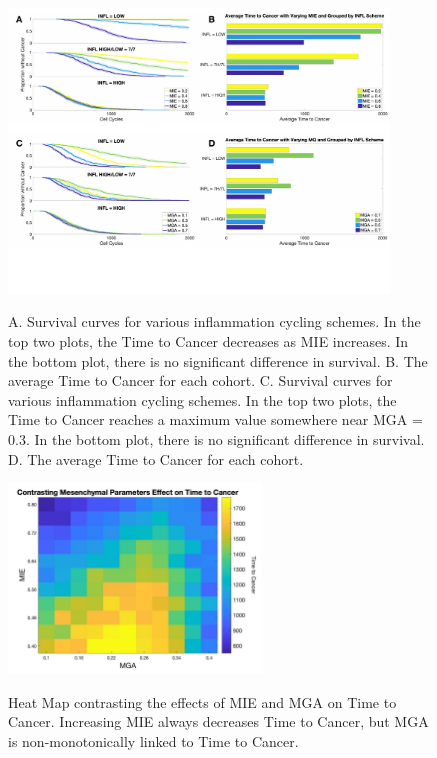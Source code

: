 \documentclass[11pt]{article}
\begin{document}
\begin{figure}
\center
{\includegraphics[width=0.9\textwidth]{Figure4/Figure4.pdf}}
\caption{A. Survival curves for various inflammation cycling schemes. In the top two plots, the Time to Cancer decreases as MIE increases. In the bottom plot, there is no significant difference in survival.
B. The average Time to Cancer for each cohort.
C. Survival curves for various inflammation cycling schemes. In the top two plots, the Time to Cancer reaches a maximum value somewhere near MGA = 0.3. In the bottom plot, there is no significant difference in survival.
D. The average Time to Cancer for each cohort.}
\label{fig:VaryINFL_and_MesPars}
\end{figure}


\begin{figure}
\center
{\includegraphics[width=0.6\textwidth]{Figure5/MIEvsMQ.jpg}}
\caption{Heat Map contrasting the effects of MIE and MGA on Time to Cancer. Increasing MIE always decreases Time to Cancer, but MGA is non-monotonically linked to Time to Cancer.}
\label{fig:MIEvsMGA}
\end{figure}
\end{document}
